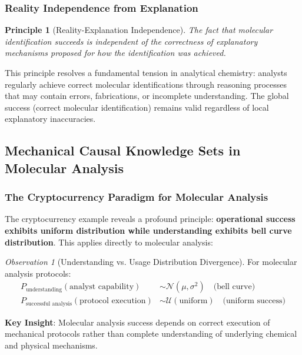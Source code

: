 \documentclass[11pt,a4paper]{article}
\newtheorem{principle}[theorem]{Principle}
\theoremstyle{remark}
\newtheorem{observation}[theorem]{Observation}
\begin{document}
\subsubsection{Reality Independence from Explanation}

\begin{principle}[Reality-Explanation Independence]
The fact that molecular identification succeeds is independent of the correctness of explanatory mechanisms proposed for how the identification was achieved.
\end{principle}

This principle resolves a fundamental tension in analytical chemistry: analysts regularly achieve correct molecular identifications through reasoning processes that may contain errors, fabrications, or incomplete understanding. The global success (correct molecular identification) remains valid regardless of local explanatory inaccuracies.

\subsection{Mechanical Causal Knowledge Sets in Molecular Analysis}

\subsubsection{The Cryptocurrency Paradigm for Molecular Analysis}

The cryptocurrency example reveals a profound principle: \textbf{operational success exhibits uniform distribution while understanding exhibits bell curve distribution}. This applies directly to molecular analysis:

\begin{observation}[Understanding vs. Usage Distribution Divergence]
For molecular analysis protocols:
\begin{align}
P_{\text{understanding}}(\text{analyst capability}) &\sim \mathcal{N}(\mu, \sigma^2) \quad \text{(bell curve)}\\
P_{\text{successful analysis}}(\text{protocol execution}) &\sim \mathcal{U}(\text{uniform}) \quad \text{(uniform success)}
\end{align}
\end{observation}

\textbf{Key Insight}: Molecular analysis success depends on correct execution of mechanical protocols rather than complete understanding of underlying chemical and physical mechanisms.
\end{document}
